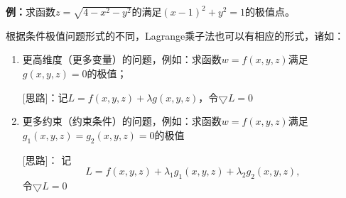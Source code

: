 {\bf 例：}求函数$z=\sqrt{4-x^2-y^2}$的满足$(x-1)^2+y^2=1$的极值点。
\begin{center}
\end{center}

根据条件极值问题形式的不同，Lagrange乘子法也可以有相应的形式，诸如：
\begin{enumerate}[(1)]
  \setlength{\itemindent}{1cm}
  \item 更高维度（更多变量）的问题，例如：求函数$w=f(x,y,z)$满足$g(x,y,z)=0$的极值； 
  
  [思路]：记$L=f(x,y,z)+\lambda g(x,y,z)$，令$\bigtriangledown L=0$ 
  \item 更多约束（约束条件）的问题，例如：求函数$w=f(x,y,z)$满足$g_1(x,y,z)=g_2(x,y,z)=0$的极值 
  
  [思路]： 记
  $$L=f(x,y,z)+\lambda_1 g_1(x,y,z)+\lambda_2 g_2(x,y,z),$$
  令$\bigtriangledown L=0$
\end{enumerate}

